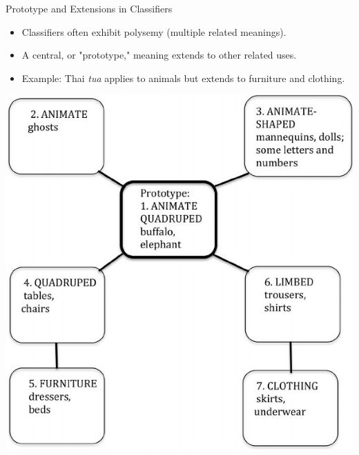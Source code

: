 \documentclass{beamer}
\begin{document}
\begin{frame}{Prototype and Extensions in Classifiers}
\begin{itemize}
    \item Classifiers often exhibit polysemy (multiple related meanings).
    \item A central, or "prototype," meaning extends to other related uses.
    \item Example: Thai \textit{tua} applies to animals but extends to furniture and clothing.
\end{itemize}
 \begin{center}
\noindent\includegraphics[height=0.6\textheight]{pics/Radial-category-structure-for-Thai-classifier-tua-Source-Adapted-from-Deepadung_W640.jpg}
 \end{center}
\end{frame}
\end{document}
